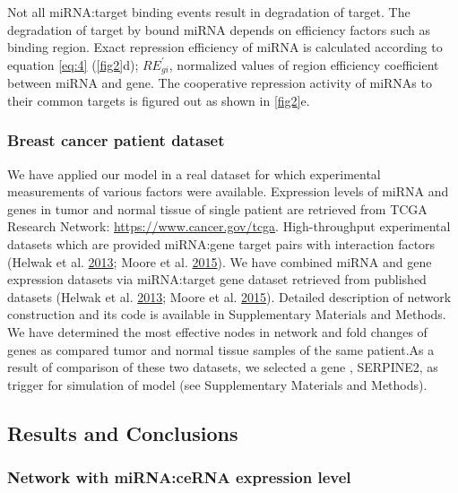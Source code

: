 \documentclass[]{article}
\begin{document}
Not all miRNA:target binding events result in degradation of target. The
degradation of target by bound miRNA depends on efficiency factors such
as binding region. Exact repression efficiency of miRNA is calculated
according to equation \eqref{eq:4} (\autoref{fig2}d);
\(RE^\prime_{gi}\), normalized values of region efficiency coefficient
between miRNA and gene. The cooperative repression activity of miRNAs to
their common targets is figured out as shown in \autoref{fig2}e.

\hypertarget{breast-cancer-patient-dataset}{%
\subsubsection{Breast cancer patient
dataset}\label{breast-cancer-patient-dataset}}

We have applied our model in a real dataset for which experimental
measurements of various factors were available. Expression levels of
miRNA and genes in tumor and normal tissue of single patient are
retrieved from TCGA Research Network: \url{https://www.cancer.gov/tcga}.
High-throughput experimental datasets which are provided miRNA:gene
target pairs with interaction factors (Helwak et al.
\protect\hyperlink{ref-helwak_mapping_2013}{2013}; Moore et al.
\protect\hyperlink{ref-moore_mirnatarget_2015}{2015}). We have combined
miRNA and gene expression datasets via miRNA:target gene dataset
retrieved from published datasets (Helwak et al.
\protect\hyperlink{ref-helwak_mapping_2013}{2013}; Moore et al.
\protect\hyperlink{ref-moore_mirnatarget_2015}{2015}). Detailed
description of network construction and its code is available in
Supplementary Materials and Methods. We have determined the most
effective nodes in network and fold changes of genes as compared tumor
and normal tissue samples of the same patient.As a result of comparison
of these two datasets, we selected a gene , SERPINE2, as trigger for
simulation of model (see Supplementary Materials and Methods).

\hypertarget{results-and-conclusions}{%
\subsection{Results and Conclusions}\label{results-and-conclusions}}

\hypertarget{network-with-mirnacerna-expression-level}{%
\subsubsection{Network with miRNA:ceRNA expression
level}\label{network-with-mirnacerna-expression-level}}
\end{document}

